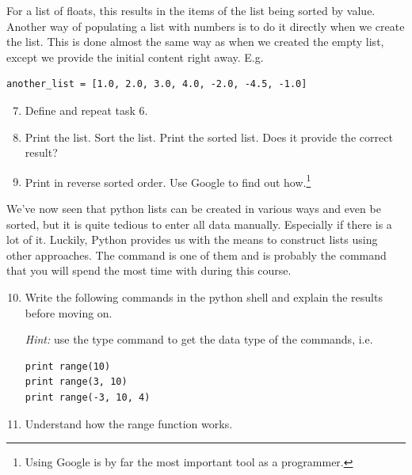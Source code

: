 \documentclass{article}
\begin{document}
For a list of floats, this results in the items of the list being sorted by value.\\

Another way of populating a list with numbers is to do it directly when
we create the list.
This is done almost the same way as when we created the empty list, except we
provide the initial content right away. E.g.

\begin{lstlisting}
another_list = [1.0, 2.0, 3.0, 4.0, -2.0, -4.5, -1.0]
\end{lstlisting}


\begin{enumerate}
  \setcounter{enumi}{6}
  \item Define  and repeat task 6.

  \item Print the list. Sort the list. Print the sorted list.
  Does it provide the correct result?

  \item Print  in reverse sorted order.
    Use Google to find out how.\footnote{Using Google is
    by far the most important tool as a programmer.}
\end{enumerate}


We've now seen that python lists can be created in various ways and even be
sorted, but it is quite tedious to enter all data manually. Especially if
there is a lot of it.
Luckily, Python provides us with the means to construct
lists using other approaches.
The  command is one of them and is probably the
command that you will spend the most time with during this course.

\begin{enumerate}
  \setcounter{enumi}{9}
  \item Write the following commands in the python shell and explain the results
    before moving on.

    {\em Hint:} use the type command to get the data type of the commands,
    i.e. 

\begin{lstlisting}
print range(10)
print range(3, 10)
print range(-3, 10, 4)
\end{lstlisting}

  \item Understand how the range function works.
\end{enumerate}
\end{document}
